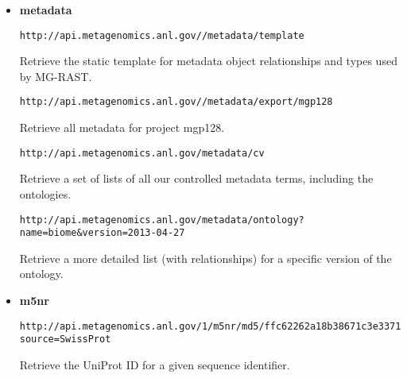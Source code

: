 \begin{itemize}
\item
\textbf{metadata}
\begin{small}
\begin{lstlisting}
http://api.metagenomics.anl.gov//metadata/template
\end{lstlisting}
\end{small} Retrieve the static template for metadata object relationships and types used by MG-RAST.
\begin{small}
\begin{lstlisting}
http://api.metagenomics.anl.gov//metadata/export/mgp128
\end{lstlisting}
\end{small} Retrieve all metadata for project mgp128.
\begin{small}
\begin{lstlisting}
http://api.metagenomics.anl.gov/metadata/cv
\end{lstlisting}
\end{small} Retrieve a set of lists of all our controlled metadata terms, including the ontologies.
\begin{small}
\begin{lstlisting}
http://api.metagenomics.anl.gov/metadata/ontology?name=biome&version=2013-04-27
\end{lstlisting}
\end{small} Retrieve a more detailed list (with relationships) for a specific version of the ontology.

\item
\textbf{m5nr}
\begin{small}
\begin{lstlisting}
http://api.metagenomics.anl.gov/1/m5nr/md5/ffc62262a18b38671c3e337150ef535f?source=SwissProt
\end{lstlisting}
\end{small} Retrieve the UniProt ID for a given sequence identifier.

\end{itemize}
